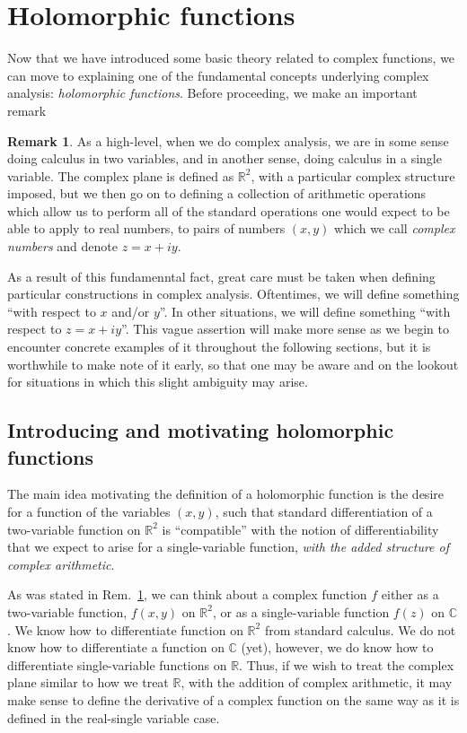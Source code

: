 \documentclass[aps,pra,showpacs,notitlepage,onecolumn,superscriptaddress,nofootinbib]{revtex4-1}
\theoremstyle{definition}
\newtheorem{remark}{Remark}[section]
\newcommand{\hhrulefill}{\hspace{-1.5em} \hrulefill}
\begin{document}
\section{Holomorphic functions}

\noindent Now that we have introduced some basic theory related to complex functions, we can move to explaining one of the fundamental concepts underlying complex analysis: \emph{holomorphic functions}.
Before proceeding, we make an important remark

\hhrulefill

\begin{remark}
  \label{rem:r2_vs_c}
As a high-level, when we do complex analysis, we are in some sense doing calculus in two variables, and in another sense, doing calculus in a single variable. The complex plane is defined as $\mathbb{R}^{2}$,
with a particular complex structure imposed, but we then go on to defining a collection of arithmetic operations which allow us to perform all of the standard operations one would expect to be able to apply to real numbers,
to pairs of numbers $(x, y)$ which we call \emph{complex numbers} and denote $z = x + iy$.

As a result of this fundamenntal fact, great care must be taken when defining particular constructions in complex analysis. Oftentimes, we will define something ``with respect to $x$ and/or $y$''. In other situations,
we will define something ``with respect to $z = x + iy$''. This vague assertion will make more sense as we begin to encounter concrete examples of it throughout the following sections, but it is worthwhile to make note
of it early, so that one may be aware and on the lookout for situations in which this slight ambiguity may arise.
\end{remark}

\hhrulefill

\subsection{Introducing and motivating holomorphic functions}

\noindent The main idea motivating the definition of a holomorphic function is the desire for a function of the variables $(x, y)$, such that standard differentiation of a two-variable function on $\mathbb{R}^2$
is ``compatible'' with the notion of differentiability that we expect to arise for a single-variable function, \emph{with the added structure of complex arithmetic}.

As was stated in Rem.~\ref{rem:r2_vs_c}, we can think about a complex function $f$ either as a two-variable function, $f(x, y)$ on $\mathbb{R}^2$, or as a single-variable function $f(z)$ on $\mathbb{C}$.
We know how to differentiate function on $\mathbb{R}^2$ from standard calculus. We do not know how to differentiate a function on $\mathbb{C}$ (yet), however, we do know how to differentiate single-variable
functions on $\mathbb{R}$. Thus, if we wish to treat the complex plane similar to how we treat $\mathbb{R}$, with the addition of complex arithmetic, it may make sense to define the derivative of a complex function on the
same way as it is defined in the real-single variable case.
\end{document}
